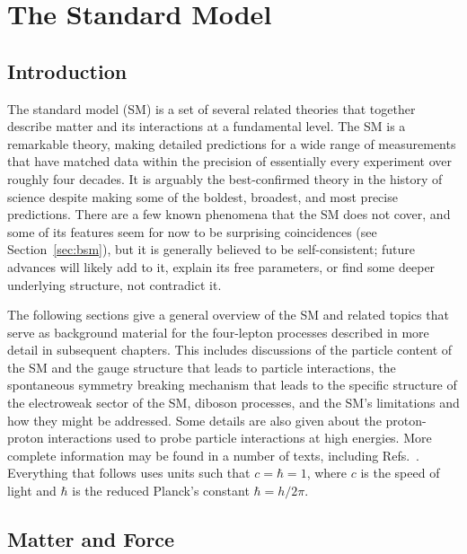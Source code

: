 

\chapter{The Standard Model}\label{ch:SM}

\section{Introduction}

The standard model (SM) is a set of several related theories that together describe matter and its interactions at a fundamental level.
The SM is a remarkable theory, making detailed predictions for a wide range of measurements that have matched data within the precision of essentially every experiment over roughly four decades.
It is arguably the best-confirmed theory in the history of science despite making some of the boldest, broadest, and most precise predictions.
There are a few known phenomena that the SM does not cover, and some of its features seem for now to be surprising coincidences (see Section~\ref{sec:bsm}), but it is generally believed to be self-consistent; future advances will likely add to it, explain its free parameters, or find some deeper underlying structure, not contradict it.

The following sections give a general overview of the SM and related topics that serve as background material for the four-lepton processes described in more detail in subsequent chapters.
This includes discussions of the particle content of the SM and the gauge structure that leads to particle interactions, the spontaneous symmetry breaking mechanism that leads to the specific structure of the electroweak sector of the SM, diboson processes, and the SM's limitations and how they might be addressed.
Some details are also given about the proton-proton interactions used to probe particle interactions at high energies.
More complete information may be found in a number of texts, including Refs.~\cite{Griffiths:111880,Halzen:1984mc,barger1997collider,Peskin:1995ev,Donoghue:238727}.
Everything that follows uses units such that $c = \hbar = 1$, where $c$ is the speed of light and $\hbar$ is the reduced Planck's constant $\hbar = h / 2\pi$.



\section{Matter and Force}


